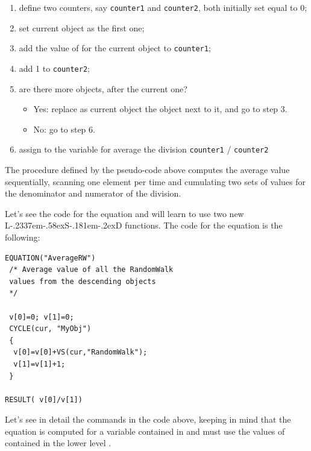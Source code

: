 \documentclass [11pt,a4paper] {book}
\def\LsD{{L\kern-.2337em\lower-.58ex\hbox{S}\kern-.181em\lower-.2ex\hbox{D}}\xspace}
\begin{document}
\begin{enumerate}
  \item define two counters, say \texttt{counter1} and \texttt{counter2}, both initially set equal to 0;
	\item set current object as the first one; 
	\item add the value of  for the current object to \texttt{counter1};
	\item add 1 to \texttt{counter2};
	\item are there more objects, after the current one?
  
\begin{itemize}
	\item Yes: replace as current object the object next to it, and go to step 3.
	\item No: go to step 6.
\end{itemize}
	\item assign to the variable for average the division \texttt{counter1} / \texttt{counter2}
\end{enumerate}

The procedure defined by the pseudo-code above computes the average value sequentially, scanning one element per time and cumulating two sets of values for the denominator and numerator of the division.

Let's see the code for the equation and will learn to use two new \LsD
functions. The code for the equation is the following:

\small
\begin{verbatim}
EQUATION("AverageRW")
 /* Average value of all the RandomWalk
 values from the descending objects
 */

 v[0]=0; v[1]=0;
 CYCLE(cur, "MyObj")
 {
  v[0]=v[0]+VS(cur,"RandomWalk");
  v[1]=v[1]+1;
 }

RESULT( v[0]/v[1])
\end{verbatim}
\normalsize

Let's see in detail the commands in the code above, keeping in mind that the equation is
computed for a variable contained in  and must use the values of
 contained in the lower level .
\end{document}
